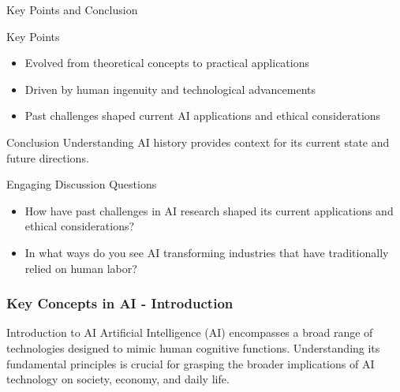 \documentclass[aspectratio=169]{beamer}
\begin{document}
\begin{frame}[fragile]{Key Points and Conclusion}
    \begin{block}{Key Points}
        \begin{itemize}
            \item Evolved from theoretical concepts to practical applications
            \item Driven by human ingenuity and technological advancements
            \item Past challenges shaped current AI applications and ethical considerations
        \end{itemize}
    \end{block}

    \begin{block}{Conclusion}
        Understanding AI history provides context for its current state and future directions.
    \end{block}
\end{frame}

\begin{frame}[fragile]{Engaging Discussion Questions}
    \begin{itemize}
        \item How have past challenges in AI research shaped its current applications and ethical considerations?
        \item In what ways do you see AI transforming industries that have traditionally relied on human labor?
    \end{itemize}
\end{frame}

\begin{frame}[fragile]
    \frametitle{Key Concepts in AI - Introduction}
    \begin{block}{Introduction to AI}
        Artificial Intelligence (AI) encompasses a broad range of technologies designed to mimic human cognitive functions. 
        Understanding its fundamental principles is crucial for grasping the broader implications of AI technology on society, economy, and daily life.
    \end{block}
\end{frame}
\end{document}
